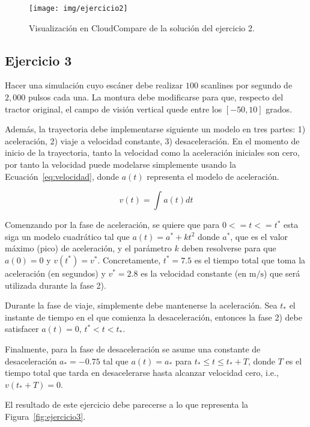 \documentclass[]{article}
\begin{document}
	\begin{figure}[htb]
		\centering
		\texttt{[image: img/ejercicio2]}
		\caption{Visualización en CloudCompare de la solución del ejercicio 2.}
		\label{fig:ejercicio2}
	\end{figure} 

	
	\pagebreak


	\subsection*{Ejercicio 3}
	Hacer una simulación cuyo escáner debe realizar $100$ scanlines por segundo de $2,000$ pulsos cada una. La montura debe modificarse para que, respecto del tractor original, el campo de visión vertical quede entre los $[-50, 10]$ grados.
	
	Además, la trayectoria debe implementarse siguiente un modelo en tres partes: 1) aceleración, 2) viaje a velocidad constante, 3) desaceleración. En el momento de inicio de la trayectoria, tanto la velocidad como la aceleración iniciales son cero, por tanto la velocidad puede modelarse simplemente usando la Ecuación~\ref{eq:velocidad}, donde $a(t)$ representa el modelo de aceleración.
	
	\begin{equation}
		v(t) = \int{a(t) dt}
	\label{eq:velocidad}
	\end{equation}
	
	Comenzando por la fase de aceleración, se quiere que para $0 <= t <= t^*$ esta siga un modelo cuadrático tal que \mbox{$a(t) = a^* + kt^2$} donde $a^*$, que es el valor máximo (pico) de aceleración, y el parámetro $k$ deben resolverse para que $a(0)=0$ y $v(t^*)=v^*$. Concretamente, $t^*=7.5$ es el tiempo total que toma la aceleración (en segundos) y $v^*=2.8$ es la velocidad constante (en $\mathrm{m}/\mathrm{s}$) que será utilizada durante la fase 2).
	
	Durante la fase de viaje, simplemente debe mantenerse la aceleración. Sea $t_*$ el instante de tiempo en el que comienza la desaceleración, entonces la fase 2) debe satisfacer $a(t) = 0$, $t^* < t < t_*$.
	
	Finalmente, para la fase de desaceleración se asume una constante de desaceleración $a_* = -0.75$ tal que $a(t) = a_*$ para $t_* \leq t \leq t_*+T$, donde $T$ es el tiempo total que tarda en desacelerarse hasta alcanzar velocidad cero, i.e., $v(t_*+T) = 0$.
	
	El resultado de este ejercicio debe parecerse a lo que representa la Figura~\ref{fig:ejercicio3}.
	
\end{document}
